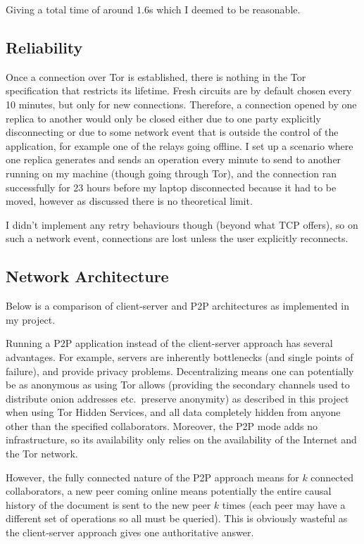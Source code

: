 \documentclass[diss.tex]{subfiles}
\begin{document}
\noindent
Giving a total time of around $1.6$s which I deemed to be reasonable.

\subsection{Reliability}
Once a connection over Tor is established, there is nothing in the Tor specification that restricts its lifetime. Fresh circuits are by default chosen every 10 minutes, but only for new connections. Therefore, a connection opened by one replica to another would only be closed either due to one party explicitly disconnecting or due to some network event that is outside the control of the application, for example one of the relays going offline. I set up a scenario where one replica generates and sends an operation every minute to send to another running on my machine (though going through Tor), and the connection ran successfully for 23 hours before my laptop disconnected because it had to be moved, however as discussed there is no theoretical limit.

I didn't implement any retry behaviours though (beyond what TCP offers), so on such a network event, connections are lost unless the user explicitly reconnects.

\subsection{Network Architecture}
Below is a comparison of client-server and P2P architectures as implemented in my project.

Running a P2P application instead of the client-server approach has several advantages. For example, servers are inherently bottlenecks (and single points of failure), and provide privacy problems. Decentralizing means one can potentially be as anonymous as using Tor allows (providing the secondary channels used to distribute onion addresses etc.\ preserve anonymity) as described in this project when using Tor Hidden Services, and all data completely hidden from anyone other than the specified collaborators. Moreover, the P2P mode adds no infrastructure, so its availability only relies on the availability of the Internet and the Tor network.

However, the fully connected nature of the P2P approach means for $k$ connected collaborators, a new peer coming online means potentially the entire causal history of the document is sent to the new peer $k$ times (each peer may have a different set of operations so all must be queried). This is obviously wasteful as the client-server approach gives one authoritative answer.
\end{document}
